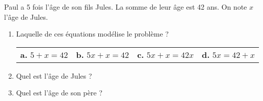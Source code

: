 
Paul a 5 fois l'âge de son fils Jules. La somme de leur âge est 42 ans. On note $x$ l'âge de Jules. 

\begin{enumerate}
\item Laquelle de ces équations modélise le problème ?

\begin{tabular}{cccc}
\textbf{a.} $5+x=42$ & \textbf{b.} $5x+x=42$ & \textbf{c.} $5x+x=42x$ & \textbf{d.} $5x=42+x$ \\ 
\end{tabular}

\item Quel est l'âge de Jules ?
\item Quel est l'âge  de son père ?
\end{enumerate}
